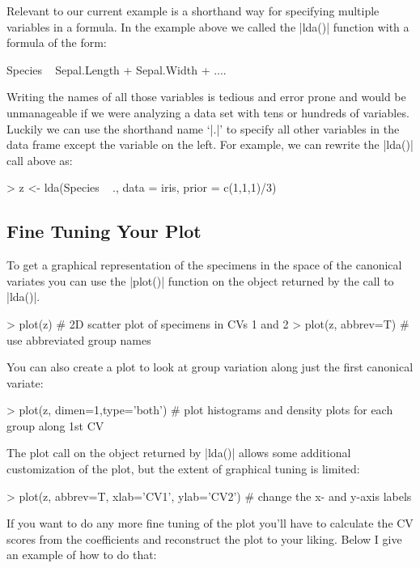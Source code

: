 Relevant to our current example is a shorthand way for specifying multiple variables in a formula. In the example above we called the |lda()| function with a formula of the form: 
\begin{R}
Species ~ Sepal.Length + Sepal.Width + ....
\end{R}

Writing the names of all those variables is tedious and error prone and would be unmanageable if we were analyzing a data set with tens or hundreds of variables. Luckily we can use the shorthand name `|.|' to specify all other variables in the data frame except the variable on the left.  For example, we can rewrite the |lda()| call above as:

\begin{R}
> z <- lda(Species ~ ., data = iris, prior = c(1,1,1)/3)
\end{R}

\subsection{Fine Tuning Your Plot}

To get a graphical representation of the specimens in the space of the canonical variates you can use the |plot()| function on the object returned by the call to |lda()|.

\begin{R}
> plot(z) # 2D scatter plot of specimens in CVs 1 and 2
> plot(z, abbrev=T) # use abbreviated group names
\end{R}

You can also create a plot to look at group variation along just the first canonical variate:

\begin{R}
> plot(z, dimen=1,type='both') # plot histograms and density plots for each group along 1st CV 
\end{R}


The plot call on the object returned by |lda()| allows some additional customization of the plot, but the extent of graphical tuning is limited:

\begin{R}
> plot(z, abbrev=T, xlab='CV1', ylab='CV2') # change the x- and y-axis labels
\end{R}

If you want to do any more fine tuning of the plot you'll have to calculate the CV scores from the coefficients and reconstruct the plot to your liking. Below I give an example of how to do that:

